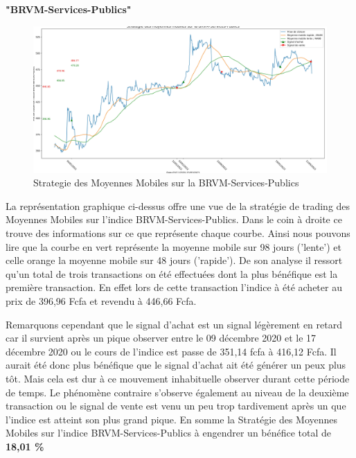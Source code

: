 \begin{itemize}
    
    \begin{center}     \textbf{"BRVM-Services-Publics"}  \end{center}
    \begin{figure}[h]
        \centering
        \includegraphics[width=1 \textwidth ]{img/MA-public.jpg}
        \caption{Strategie des Moyennes Mobiles sur la BRVM-Services-Publics}
        \label{fig:Strategie des Moyennes Mobiles sur la BRVM-Services-Publics}
    \end{figure}
    \par{
        La représentation graphique ci-dessus offre une vue de la stratégie de trading 
        des Moyennes Mobiles sur l'indice BRVM-Services-Publics. Dans le coin à droite ce trouve 
        des informations sur ce que représente chaque courbe. Ainsi nous pouvons lire que 
        la courbe en vert représente la moyenne mobile sur 98 jours ('lente') et celle orange la 
        moyenne mobile sur 48 jours ('rapide'). 
        De son analyse il ressort qu'un total de trois transactions on été effectuées dont la plus bénéfique 
        est la première transaction. En effet lors de cette transaction l'indice à été acheter au prix de 
        396,96 Fcfa et revendu à 446,66 Fcfa. 
        
        Remarquons cependant que le signal d'achat est un signal 
        légèrement en retard car il survient après un pique observer entre le 09 décembre 2020 et le 17 
        décembre 2020 ou le cours de l'indice est passe de 351,14 fcfa à 416,12 Fcfa. Il aurait été donc plus 
        bénéfique que le signal d'achat ait été générer un peux plus tôt. Mais cela est dur à ce mouvement 
        inhabituelle observer durant cette période de temps. 
        Le phénomène contraire s'observe également 
        au niveau de la deuxième transaction ou le signal de vente est venu un peu trop tardivement après un 
        que l'indice est atteint son plus grand pique.
        En somme la Stratégie des Moyennes Mobiles sur l'indice BRVM-Services-Publics à engendrer un bénéfice 
        total de \textbf{18,01 \%} }




\end{itemize}
